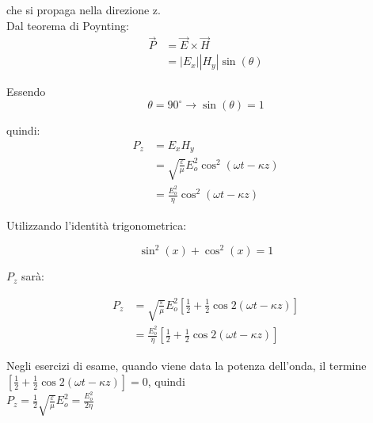 che si propaga nella direzione z. \\

Dal teorema di Poynting: 
{
    \Large
    \begin{equation}
        \begin{split}
        \vec{P} 
        &= \vec{E} \times \vec{H} 
        \\ 
        &= \left|E_x\right| \left|H_y\right| \sin(\theta) 
        \end{split}
    \end{equation}
}

Essendo 
{
    \Large
    \begin{equation}
   \theta = 90 ^{\circ} 
   \rightarrow \sin(\theta) = 1     
    \end{equation}
} 

quindi: \\ 

{
    \Large
    \begin{equation}
        \begin{split}
            P_z 
            &= E_x H_y 
            \\
            &= \sqrt{\frac{\varepsilon}{\mu}} E_o ^{2} \cos^{2}(\omega t - \kappa z) 
            \\
            &= \frac{E_o ^{2}}{\eta } \cos^{2}(\omega t - \kappa z)        
        \end{split}
    \end{equation}
}

Utilizzando l'identità trigonometrica: 

{
    \Large
    \begin{equation}
    \sin^{2}(x) + \cos^{2}(x) = 1     
    \end{equation}
}

$P_z$ sarà:  

{
    \Large
    \begin{equation}
        \begin{split}
        P_z 
        &= 
        \sqrt{\frac{\varepsilon}{\mu}} E_o ^{2} [\frac{1}{2} + \frac{1}{2} \cos 2 (\omega t - \kappa z)] 
        \\ 
        &= \frac{E_o ^{2}}{\eta} [\frac{1}{2} + \frac{1}{2} \cos 2 (\omega t - \kappa z)]
        \end{split}
    \end{equation}
}

\begin{tcolorbox}
    Negli esercizi di esame, quando viene data la potenza dell'onda, il termine \\ $[\frac{1}{2} + \frac{1}{2} \cos 2 (\omega t - \kappa z)] = 0$, quindi \\ 

    $P_z = \frac{1}{2} \sqrt{\frac{\varepsilon}{\mu}} E_o ^{2} = \frac{E_o ^{2}}{2 \eta}$


\end{tcolorbox}

